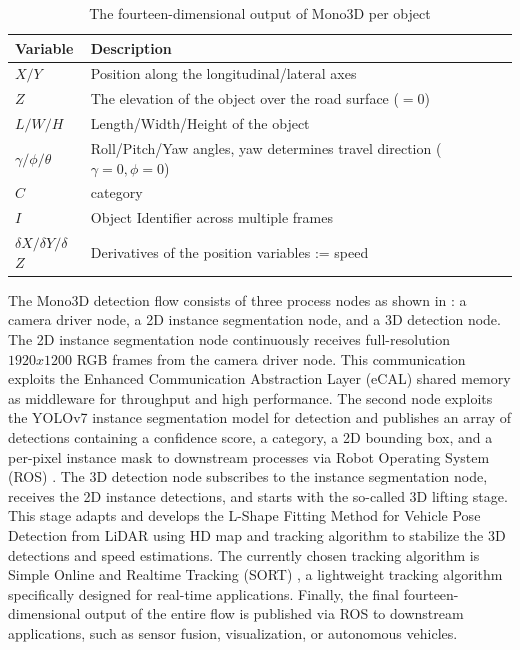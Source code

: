 \begin{table}[htb]%
	\centering%
	\begin{tabular}{ll}
		\toprule
		\textbf{Variable}  & \textbf{Description}  \\
		\midrule
		$X/Y$ & Position along the longitudinal/lateral axes  \\
		$Z$ & The elevation of the object over the road surface ($=0$)\\
		$L/W/H$ & Length/Width/Height of the object \\
		$\gamma/\phi/\theta$ & Roll/Pitch/Yaw angles, yaw determines travel direction ($\gamma=0, \phi=0$) \\
		$C$ & category \\
		$I$ & Object Identifier across multiple frames \\
		$\delta$$X/$$\delta$$Y/$$\delta$$Z$ & Derivatives of the position variables := speed  \\
		\bottomrule
	\end{tabular}
	\caption{The fourteen-dimensional output of Mono3D per object}
	\label{tab:mono3dOutputVariables}%
\end{table}

The Mono3D detection flow consists of three process nodes as shown in : a camera driver node, a 2D instance segmentation node, and a 3D detection node. The 2D instance segmentation node continuously receives full-resolution $1920x1200$ RGB frames from the camera driver node. This communication exploits the Enhanced Communication Abstraction Layer (eCAL) \cite{ecal} shared memory as middleware for throughput and high performance. The second node exploits the YOLOv7 \cite{yolov7} instance segmentation model for detection and publishes an array of detections containing a confidence score, a category, a 2D bounding box, and a per-pixel instance mask to downstream processes via Robot Operating System (ROS) \cite{ros}. The 3D detection node subscribes to the instance segmentation node, receives the 2D instance detections, and starts with the so-called 3D lifting stage. This stage adapts and develops the L-Shape Fitting Method for Vehicle Pose Detection from LiDAR \cite{lsf} using HD map and tracking algorithm to stabilize the 3D detections and speed estimations. The currently chosen tracking algorithm is Simple Online and Realtime Tracking (SORT) \cite{sort}, a lightweight tracking algorithm specifically designed for real-time applications. Finally, the final fourteen-dimensional output of the entire flow is published via ROS to downstream applications, such as sensor fusion, visualization, or autonomous vehicles.

